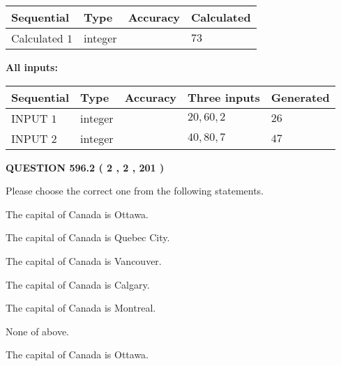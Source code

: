 \documentclass[12pt]{article}
\begin{document}
   
  
  
\noindent\begin{tabular}{|l|l|l|l|}
\hline
 Sequential & Type & Accuracy & Calculated \\ 
\hline
 
 
  Calculated $  1 $ & integer &  & 
  $ 73 $ 
 \\  \hline  
 \end{tabular}
   
   
   
   
\noindent\vspace{0.1in}\hspace{-0.08in} {\textbf{\Large{All inputs: }}}
   
   
  
  
\noindent\begin{tabular}{|l|l|l|l|l|}
\hline
 Sequential & Type & Accuracy & Three inputs & Generated \\ 
\hline
 
 
  INPUT $  1 $ & integer &  & $
 20
 , 
 60
 , 
 2
 $ & $ 26 $ 
 \\  \hline  
 
 
  INPUT $  2 $ & integer &  & $
 40
 , 
 80
 , 
 7
 $ & $ 47 $ 
 \\  \hline  
 \end{tabular}
   
   
  
\vspace{0.2in}
  
{\textbf{\Large{QUESTION
596.2 
 ( 2 , 2 , 201 )
}}}
  
  
Please choose the correct one from the following statements.
 
 
The capital of Canada is Ottawa.
 
 
The capital of Canada is Quebec City.
 
 
The capital of Canada is Vancouver.
 
 
The capital of Canada is Calgary.
 
 
The capital of Canada is Montreal.
 
 
 None of above.
 
 
\noindent{}
 
 
The capital of Canada is Ottawa.
 
\end{document}

